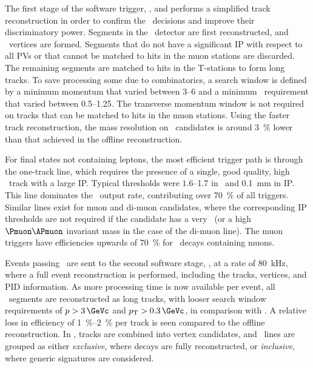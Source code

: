 The first stage of the software trigger, \hltone, and performs a simplified 
track reconstruction in order to confirm the \lzero\ decisions and improve 
their discriminatory power.
Segments in the \velo\ detector are first reconstructed, and \pp\ vertices are 
formed.
Segments that do not have a significant \ac{IP} with respect to all \acp{PV} or 
that cannot be matched to hits in the muon stations are discarded.
The remaining segments are matched to hits in the T-stations to form long 
tracks.
To save processing some due to combinatorics, a search window is defined by a 
minimum momentum that varied between \SIrange{3}{6}{\GeVc} and a minimum \pT\ 
requirement that varied between \SIrange{0.5}{1.25}{\GeVc}.
The transverse momentum window is not required on tracks that can be matched to 
hits in the muon stations.
Using the faster track reconstruction, the mass resolution on \JpsiTomumu\ 
candidates is around \SI{3}{\percent} lower than that achieved in the offline 
reconstruction.

For final states not containing leptons, the most efficient trigger path is 
through the one-track line, which requires the presence of a single, good 
quality, high \pT\ track with a large \ac{IP}.
Typical thresholds were $1.6$--\SI{1.7}{\GeVc} in \pT\ and 
\SI{0.1}{\milli\metre} in \ac{IP}.
This line dominates the \hltone\ output rate, contributing over 
\SI{70}{\percent} of all triggers.
Similar lines exist for muon and di-muon candidates, where the corresponding 
\ac{IP} thresholds are not required if the candidate has a very \pT\ (or a high 
$\Pmuon\APmuon$ invariant mass in the case of the di-muon line).
The muon triggers have efficiencies upwards of \SI{70}{\percent} for \PB\ 
decays containing muons.

Events passing \hltone\ are sent to the second software stage, \hlttwo, at a 
rate of \SI{80}{\kilo\hertz}, where a full event reconstruction is performed, 
including the tracks, vertices, and \ac{PID} information.
As more processing time is now available per event, all \velo\ segments are 
reconstructed as long tracks, with looser search window requirements of $\ptot 
> \SI{3}{\GeVc}$ and $\pT > \SI{0.3}{\GeVc}$, in comparison with \hltone.
A relative loss in efficiency of \SIrange{1}{2}{\percent} per track is seen 
compared to the offline reconstruction.
In \hlttwo, tracks are combined into vertex candidates, and \hlttwo\ lines are 
grouped as either \emph{exclusive}, where decays are fully reconstructed, or 
\emph{inclusive}, where generic signatures are considered.


